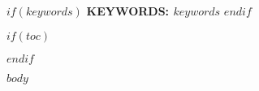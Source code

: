 \documentclass[12pt]{article}
\begin{document}
    $if(keywords)$
        \textbf{KEYWORDS: $keywords$}
    $endif$

    \vfill

\newpage

$if(toc)$
    \setcounter{tocdepth}{$toc-depth$}
    \tableofcontents
$endif$

\listoffigures
{}
\listoftables
{}
\newpage

\fancyhf{}
\fancyhead[R]{\thepage}
\setlength{\headheight}{15pt}

$body$
\end{document}
